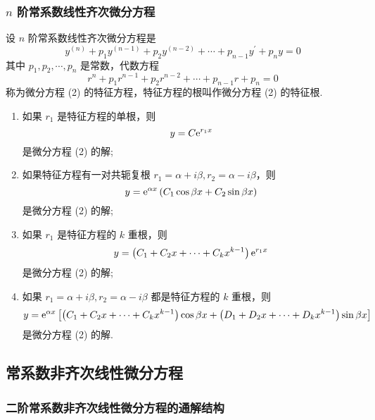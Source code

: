 \subsubsection{$n$ 阶常系数线性齐次微分方程}

\begin{theorem}[$n$ 阶常系数线性齐次微分方程通解结构]
    设 $ n $ 阶常系数线性齐次微分方程是
    \begin{equation*}
        y^{(n)}+p_{1} y^{(n-1)}+p_{2} y^{(n-2)}+\cdots+p_{n-1} y^{\prime}+p_{n} y=0
        \tag{2}
    \end{equation*}
    其中 $ p_{1}, p_{2}, \cdots, p_{n} $ 是常数，代数方程
    $$r^{n}+p_{1} r^{n-1}+p_{2} r^{n-2}+\cdots+p_{n-1} r+p_{n}=0$$
    称为微分方程 (2) 的特征方程，特征方程的根叫作微分方程 (2) 的特征根.
    \begin{enumerate}[label=(\arabic{*})]
        \item 如果 $ r_{1} $ 是特征方程的单根，则
              $$y=C \mathrm{e}^{r_{1} x}$$
              是微分方程 (2) 的解;
        \item 如果特征方程有一对共轭复根 $ r_{1}=\alpha+i \beta, r_{2}=\alpha-i \beta$，则
              $$y=\mathrm{e}^{\alpha x}\left(C_{1} \cos \beta x+C_{2} \sin \beta x\right)$$
              是微分方程 (2) 的解;
        \item 如果 $ r_{1} $ 是特征方程的 $ k $ 重根，则
              $$y=\left(C_{1}+C_{2} x+\cdots+C_{k} x^{k-1}\right) \mathrm{e}^{r_{1} x}$$
              是微分方程 (2) 的解;
        \item 如果 $ r_{1}=\alpha+i \beta, r_{2}=\alpha-i \beta $ 都是特征方程的 $ k $ 重根，则
              $$y=\mathrm{e}^{\alpha x}\left[\left(C_{1}+C_{2} x+\cdots+C_{k} x^{k-1}\right) \cos \beta x+\left(D_{1}+D_{2} x+\cdots+D_{k} x^{k-1}\right) \sin \beta x\right]$$
              是微分方程 (2) 的解.
    \end{enumerate}
\end{theorem}

\subsection{常系数非齐次线性微分方程}

\subsubsection{二阶常系数非齐次线性微分方程的通解结构}


